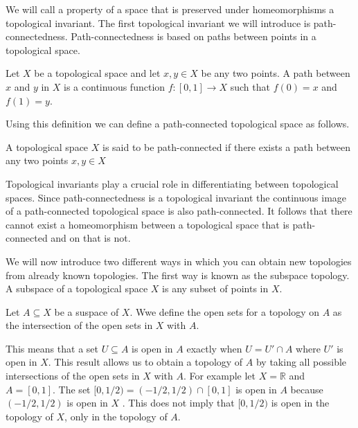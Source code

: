 We will call a property of a space that is preserved under homeomorphisms a topological invariant. The first topological invariant we will introduce is path-connectedness. Path-connectedness is based on paths between points in a topological space.

\begin{defn} Let $X$ be a topological space and let $x, y \in X$ be any two points. A path between $x$ and $y$ in $X$ is a continuous function $f: [0, 1] \to X$ such that $f(0) = x$ and $f(1) = y$.  \end{defn}

Using this definition we can define a path-connected topological space as follows.

\begin{defn} A topological space $X$ is said to be path-connected if there exists a path between any two points $x, y \in X$  \end{defn}


Topological invariants play a crucial role in differentiating between topological spaces. Since path-connectedness is a topological invariant the continuous image of a path-connected topological space is also path-connected.  It follows that there cannot exist a homeomorphism between a topological space that is path-connected and on that is not.

We will now introduce two different ways in which you can obtain new topologies from already known topologies. The first way is known as the subspace topology. A subspace of a topological space $X$ is any subset of points in $X$.

\begin{defn} Let $A \subseteq X$ be a suspace of $X$. Wwe define the open sets for a topology on $A$ as the intersection of the open sets in $X$ with $A$. \end{defn}

This means that a set $U \subseteq A$ is open in $A$ exactly when $U = U' \cap A$ where $U'$ is open in $X$. This result allows us to obtain a topology of $A$ by taking all possible intersections of the open sets in $X$ with $A$. For example let $X = \mathbb{R}$ and $A = [0, 1]$. The set $[0, 1/2) = (-1/2, 1/2) \cap [0, 1]$ is open in $A$ because $(-1/2, 1/2)$ is open in $X$
. This does not imply that $[0, 1/2)$ is open in the topology of $X$, only in the topology of $A$.

